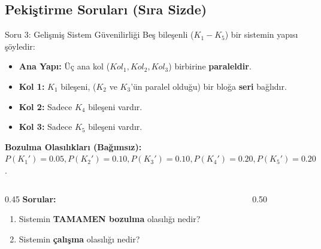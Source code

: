 \documentclass[light]{lutbeamer}
\begin{document}
\subsection{Pekiştirme Soruları (Sıra Sizde)}

\begin{frame}{Soru 3: Gelişmiş Sistem Güvenilirliği}
    \small
    Beş bileşenli ($K_1 - K_5$) bir sistemin yapısı şöyledir:
    \begin{itemize}
        \item \textbf{Ana Yapı:} Üç ana kol ($Kol_1, Kol_2, Kol_3$) birbirine \textbf{paraleldir}.
        \item \textbf{Kol 1:} $K_1$ bileşeni, ($K_2$ ve $K_3$'ün paralel olduğu) bir bloğa \textbf{seri} bağlıdır.
        \item \textbf{Kol 2:} Sadece $K_4$ bileşeni vardır.
        \item \textbf{Kol 3:} Sadece $K_5$ bileşeni vardır.
    \end{itemize}

    \textbf{Bozulma Olasılıkları (Bağımsız):}
    $P(K_1')=0.05, P(K_2')=0.10, P(K_3')=0.10, P(K_4')=0.20, P(K_5')=0.20$.

    \vspace{0.2cm}
    \begin{columns}[T]
        \begin{column}{0.45\textwidth}
            \textbf{Sorular:}
            \begin{enumerate}
                \item[(a)] Sistemin \textbf{TAMAMEN bozulma} olasılığı nedir?
                \item[(b)] Sistemin \textbf{çalışma} olasılığı nedir?
            \end{enumerate}
        \end{column}
        \begin{column}{0.50\textwidth}
            \centering
\end{column}
\end{columns}
\end{frame}
\end{document}
